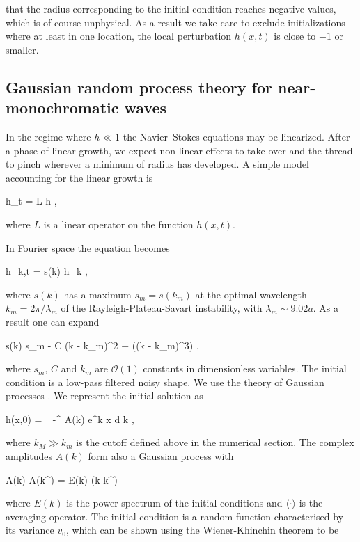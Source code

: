 that the radius corresponding to the initial condition reaches negative values, 
which is of course unphysical. 
As a result we take care to exclude initializations where at least in one location, 
the local perturbation $h(x,t)$ is close to $-1$ or smaller.

\subsection*{Gaussian random process theory for near-monochromatic waves}

In the regime where $h \ll 1$ the Navier--Stokes equations may be linearized.
After a phase of linear growth, we expect non linear effects to take over 
and the thread to pinch wherever a minimum of radius has developed. 
A simple model accounting for the linear growth is  

\be
h_t = L h , 
\nd

where $L$ is a linear operator on the function $h(x,t)$.
%

\newcommand\hhh{\hat h}

In Fourier space the equation becomes

\be
\hhh_{k,t} = s(k) \hhh_k \label{linth} ,
\nd

where $s(k)$ has a maximum $s_m = s(k_m)$ at the optimal wavelength $k_m = 2\pi/\lambda_m$ of
the Rayleigh-Plateau-Savart instability, with $\lambda_m \sim 9.02 a$. 
As a result one can expand

\be
s(k) \simeq s_m -  C (k - k_m)^2 + ((k - k_m)^3) , 
\nd

where $s_m$, $C$ and $k_m$ are $\mathcal{O}(1)$ constants in dimensionless variables.
The initial condition is a low-pass filtered noisy shape. We use the theory of
Gaussian processes .
We represent the initial solution as

\be
h(x,0) = \int_{-\infty}^{\infty}  A(k) e^{\ii k x} {\textrm{d}} k , 
\nd

where $k_M \gg k_m$ is the cutoff defined above in the numerical section. 
The complex amplitudes $A(k)$ form also a Gaussian process \cite{monin1971statistical} with

\be
\langle A(k) \overline A(k^\prime) \rangle =  E(k) \delta(k-k^\prime)
\nd

where $E(k)$ is the power spectrum of the initial conditions and
$\langle \cdot \rangle$ is the averaging operator. 
The initial condition is a random function characterised by its variance 
$v_0$, which can be shown using the Wiener-Khinchin theorem to be 

